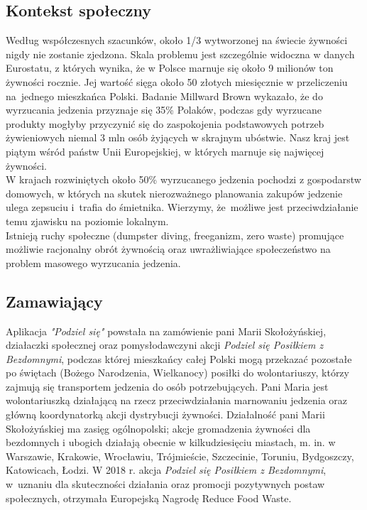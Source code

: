 \documentclass[11pt]{article}
\begin{document}
\subsection*{Kontekst społeczny}
Według współczesnych szacunków, około 1/3 wytworzonej na świecie żywności nigdy nie zostanie zjedzona. Skala problemu jest szczególnie widoczna w danych Eurostatu, z których wynika, że w Polsce marnuje się około 9 milionów ton żywności rocznie. Jej wartość sięga około 50 złotych miesięcznie w przeliczeniu na~jednego mieszkańca Polski. Badanie Millward Brown wykazało, że do wyrzucania jedzenia przyznaje się 35\% Polaków, podczas gdy wyrzucane produkty mogłyby przyczynić się do zaspokojenia podstawowych potrzeb żywieniowych niemal 3 mln osób żyjących w skrajnym ubóstwie. Nasz kraj jest piątym wśród państw Unii Europejskiej, w których marnuje się najwięcej żywności.
\vspace{2mm}\\
W krajach rozwiniętych około 50\% wyrzucanego jedzenia pochodzi z gospodarstw domowych, w których na skutek nierozważnego planowania zakupów jedzenie ulega zepsuciu i~trafia do śmietnika. Wierzymy, że~możliwe jest przeciwdziałanie temu zjawisku na poziomie lokalnym.\vspace{2mm}\\
Istnieją ruchy społeczne (dumpster diving, freeganizm, zero waste) promujące możliwie racjonalny obrót żywnością oraz uwrażliwiające społeczeństwo na problem masowego wyrzucania jedzenia.

\subsection*{Zamawiający}
Aplikacja \textit{"Podziel się"} powstała na zamówienie pani Marii Skołożyńskiej, działaczki społecznej oraz pomysłodawczyni akcji \textit{Podziel się Posiłkiem z Bezdomnymi}, podczas której mieszkańcy całej Polski mogą przekazać pozostałe po świętach (Bożego Narodzenia, Wielkanocy) posiłki do wolontariuszy, którzy zajmują się transportem jedzenia do osób potrzebujących. Pani Maria jest wolontariuszką działającą na rzecz przeciwdziałania marnowaniu jedzenia oraz główną koordynatorką akcji dystrybucji żywności. Działalność pani Marii Skołożyńskiej ma zasięg ogólnopolski; akcje gromadzenia żywności dla bezdomnych i ubogich działają obecnie w kilkudziesięciu miastach, m. in. w Warszawie, Krakowie, Wrocławiu, Trójmieście, Szczecinie, Toruniu, Bydgoszczy, Katowicach, Łodzi. W 2018 r. akcja \textit{Podziel się Posiłkiem z Bezdomnymi}, w~uznaniu dla skuteczności działania oraz promocji pozytywnych postaw społecznych, otrzymała Europejską Nagrodę Reduce Food Waste.
\end{document}
